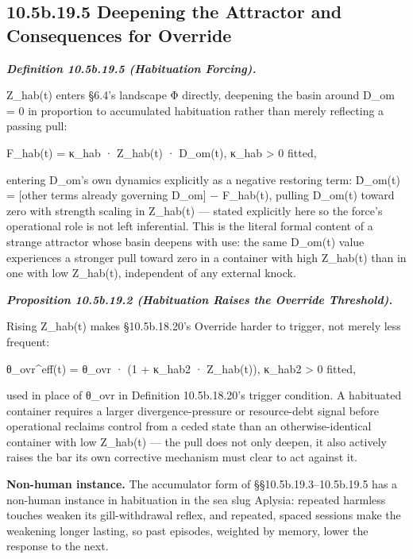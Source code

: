 \documentclass[
]{article}
\begin{document}
\hypertarget{b.19.5-deepening-the-attractor-and-consequences-for-override}{%
\subsection{10.5b.19.5 Deepening the Attractor and Consequences for
Override}\label{b.19.5-deepening-the-attractor-and-consequences-for-override}}

\emph{\textbf{Definition 10.5b.19.5 (Habituation Forcing).}}

Z\_hab(t) enters §6.4's landscape Φ directly, deepening the basin around
D\_om = 0 in proportion to accumulated habituation rather than merely
reflecting a passing pull:

F\_hab(t) = κ\_hab · Z\_hab(t) · D\_om(t), κ\_hab \textgreater{} 0
fitted,

entering D\_om's own dynamics explicitly as a negative restoring term:
Ḋ\_om(t) = {[}other terms already governing D\_om{]} − F\_hab(t),
pulling D\_om(t) toward zero with strength scaling in Z\_hab(t) ---
stated explicitly here so the force's operational role is not left
inferential. This is the literal formal content of a strange attractor
whose basin deepens with use: the same D\_om(t) value experiences a
stronger pull toward zero in a container with high Z\_hab(t) than in one
with low Z\_hab(t), independent of any external knock.

\emph{\textbf{Proposition 10.5b.19.2 (Habituation Raises the Override
Threshold).}}

Rising Z\_hab(t) makes §10.5b.18.20's Override harder to trigger, not
merely less frequent:

θ\_ovr\^{}eff(t) = θ\_ovr · (1 + κ\_hab2 · Z\_hab(t)), κ\_hab2
\textgreater{} 0 fitted,

used in place of θ\_ovr in Definition 10.5b.18.20's trigger condition. A
habituated container requires a larger divergence-pressure or
resource-debt signal before operational reclaims control from a ceded
state than an otherwise-identical container with low Z\_hab(t) --- the
pull does not only deepen, it also actively raises the bar its own
corrective mechanism must clear to act against it.

\textbf{Non-human instance.} The accumulator form of
§§10.5b.19.3--10.5b.19.5 has a non-human instance in habituation in the
sea slug Aplysia: repeated harmless touches weaken its gill-withdrawal
reflex, and repeated, spaced sessions make the weakening longer lasting,
so past episodes, weighted by memory, lower the response to the next.
\end{document}
